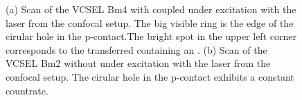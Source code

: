 	\begin{figure}[tp]
		\begin{subfigure}[t]{ 0.49\linewidth}
			\centering
			\caption{}
			\label{subfig::vcsel_confocal_laser_excitation_with_diamond}
		\end{subfigure}
		\hfill
		\begin{subfigure}[t]{ 0.49\linewidth}
			\centering
			\caption{}
			\label{subfig::confocal_laser_excitation_without_diamond}
		\end{subfigure}
		\caption{(a) Scan of the VCSEL Bm4 with coupled \nd under excitation with the laser from the confocal setup. The big visible ring is the edge of the cirular hole in the p-contact.The bright spot in the upper left corner corresponds to the transferred \nd containing an \siv. (b) Scan of the VCSEL Bm2 without \nd under excitation with the laser from the confocal setup. The cirular hole in the p-contact exhibits a constant countrate.}
	\end{figure}

